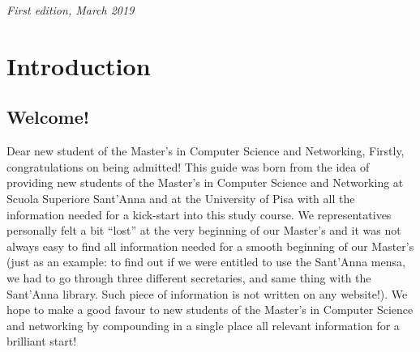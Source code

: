 \documentclass[11pt,fleqn,oneside]{book} %
\begin{document}
\noindent \textit{First edition, March 2019} %




\pagestyle{empty} %

\tableofcontents %

\cleardoublepage %

\pagestyle{fancy} %



\chapter{Introduction}


\section{Welcome!}

Dear new student of the Master’s in Computer Science and Networking,
Firstly, congratulations on being admitted!  This guide was born from the idea of providing new students of the Master’s in Computer Science and Networking at Scuola Superiore Sant’Anna and at the University of Pisa with all the information needed for a kick-start into this study course. We representatives personally felt a bit “lost” at the very beginning of our Master’s and it was not always easy to find all information needed for a smooth beginning of our Master’s (just as an example: to find out if we were entitled to use the Sant’Anna mensa, we had to go through three different secretaries, and same thing with the Sant’Anna library. Such piece of information is not written on any website!). 
We hope to make a good favour to new students of the Master’s in Computer Science and networking by compounding in a single place all relevant information for a brilliant start!
\end{document}
